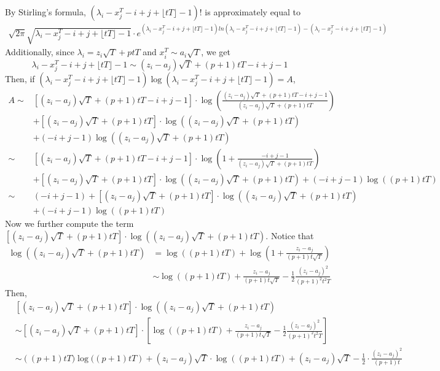 \documentclass[12pt]{article}
\begin{document}
By Stirling's formula, $(\lambda_{i}-x_{j}^{T}-i+j+\lfloor tT \rfloor -1)!$ is approximately equal to
\begin{align*}
\sqrt{2\pi}\sqrt{\lambda_{i}-x_{j}^{T}-i+j+\lfloor tT \rfloor -1}\cdot  e^{(\lambda_{i}-x_{j}^{T}-i+j+\lfloor tT \rfloor -1)ln(\lambda_{i}-x_{j}^{T}-i+j+\lfloor tT \rfloor -1)-(\lambda_{i}-x_{j}^{T}-i+j+\lfloor tT \rfloor -1)}
\end{align*}
Additionally, since $\lambda_{i}=z_{i}\sqrt{T}+ptT$ and $x_{i}^{T}\sim a_{i}\sqrt{T}$, we get \[\lambda_{i}-x_{j}^{T}-i+j+\lfloor tT \rfloor -1\sim (z_{i}-a_{j})\sqrt{T} + (p+1)tT-i+j-1\]
Then,	if $(\lambda_{i}-x_{j}^{T}-i+j+\lfloor tT \rfloor -1)\log(\lambda_{i}-x_{j}^{T}-i+j+\lfloor tT \rfloor -1)=A$,
\begin{align*}
A\sim&\left[(z_{i}-a_{j})\sqrt{T}+(p+1)tT-i+j-1\right]\cdot\log\left(\frac{(z_{i}-a_{j})\sqrt{T}+(p+1)tT-i+j-1}{(z_{i}-a_{j})\sqrt{T}+(p+1)tT}\right)\\&+\left[(z_{i}-a_{j})\sqrt{T}+(p+1)tT\right]\cdot \log\left((z_{i}-a_{j})\sqrt{T}+(p+1)tT\right)\\
	& +(-i+j-1)\log\left((z_{i}-a_{j})\sqrt{T}+(p+1)tT\right)\\
	\sim & \left[(z_{i}-a_{j})\sqrt{T}+(p+1)tT-i+j-1\right]\cdot \log\left(1+\frac{-i+j-1}{(z_{i}-a_{j})\sqrt{T}+(p+1)tT}\right)\\
	& +\left[(z_{i}-a_{j})\sqrt{T}+(p+1)tT\right]\cdot
	\log\left((z_{i}-a_{j})\sqrt{T}+(p+1)tT\right)+ (-i+j-1)\log\left((p+1)tT\right)\\
	\sim&  \left(-i+j-1\right) + \left[(z_{i}-a_{j})\sqrt{T}+(p+1)tT\right]\cdot \log\left((z_{i}-a_{j})\sqrt{T}+(p+1)tT\right)\\&+(-i+j-1)\log\left((p+1)tT\right)
\end{align*}
Now we further compute the term $\left[(z_{i}-a_{j})\sqrt{T}+(p+1)tT\right]\cdot \log\left((z_{i}-a_{j})\sqrt{T}+(p+1)tT\right)$. Notice that
\begin{align*}
	\log\left((z_{i}-a_{j})\sqrt{T}+(p+1)tT\right)&= \log\left((p+1)tT\right)+\log\left(1+\frac{z_{i}-a_{j}}{(p+1)t\sqrt{T}}\right)\\
	&\sim \log((p+1)tT)+\frac{z_{i}-a_{j}}{(p+1)t\sqrt{T}}-\frac{1}{2}\frac{(z_{i}-a_{j})^2}{(p+1)^{2}t^{2}T}
\end{align*}
Then, 
\begin{align*}
	& \left[(z_{i}-a_{j})\sqrt{T}+(p+1)tT\right]\cdot \log\left((z_{i}-a_{j})\sqrt{T}+(p+1)tT\right)\\
	&\sim\left[(z_{i}-a_{j})\sqrt{T}+(p+1)tT\right]\cdot \left[\log((p+1)tT)+\frac{z_{i}-a_{j}}{(p+1)t\sqrt{T}}-\frac{1}{2}\frac{(z_{i}-a_{j})^2}{(p+1)^{2}t^{2}T}\right]\\
	&\sim \left((p+1)tT)\log((p+1)tT\right)+(z_{i}-a_{j})\sqrt{T}\cdot \log((p+1)tT)+(z_{i}-a_{j})\sqrt{T}-\frac{1}{2}\cdot\frac{(z_{i}-a_{j})^2}{(p+1)t}
\end{align*}
\end{document}
